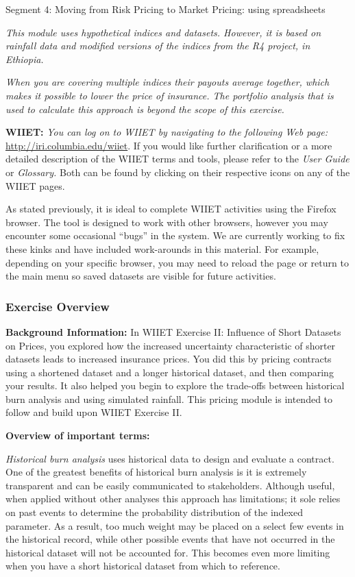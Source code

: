 \documentclass[letterpaper,10pt,english]{sphinxmanual}
\begin{document}
Segment 4: Moving from Risk Pricing to Market Pricing: using spreadsheets

\emph{This module uses hypothetical indices and datasets. However, it is based on rainfall data and modified versions of the indices from the R4 project, in Ethiopia.}

\emph{When you are covering multiple indices their payouts average together, which makes it possible to lower the price of insurance. The portfolio analysis that is used to calculate this approach is beyond the scope of this exercise.}

\textbf{WIIET:} \emph{You can log on to WIIET by navigating to the following Web page:} \href{http://iri.columbia.edu/wiiet}{http://iri.columbia.edu/wiiet}. If you would like further clarification or a more detailed description of the WIIET terms and tools, please refer to the \emph{User Guide} or \emph{Glossary.} Both can be found by clicking on their respective icons on any of the WIIET pages.

As stated previously, it is ideal to complete WIIET activities using the Firefox browser. The tool is designed to work with other browsers, however you may encounter some occasional ``bugs'' in the system. We are currently working to fix these kinks and have included work-arounds in this material. For example, depending on your specific browser, you may need to reload the page or return to the main menu so saved datasets are visible for future activities.


\subsubsection{Exercise Overview}
\label{wiiet/wiiet_initialtomarketpricing_Web:exercise-overview}
\textbf{Background Information:} In WIIET Exercise II: Influence of Short Datasets on Prices, you explored how the increased uncertainty characteristic of shorter datasets leads to increased insurance prices. You did this by pricing contracts using a shortened dataset and a longer historical dataset, and then comparing your results. It also helped you begin to explore the trade-offs between historical burn analysis and using simulated rainfall. This pricing module is intended to follow and build upon WIIET Exercise II.

\textbf{Overview of important terms:}

\emph{Historical burn analysis} uses historical data to design and evaluate a contract. One of the greatest benefits of historical burn analysis is it is extremely transparent and can be easily communicated to stakeholders. Although useful, when applied without other analyses this approach has limitations; it sole relies on past events to determine the probability distribution of the indexed parameter. As a result, too much weight may be placed on a select few events in the historical record, while other possible events that have not occurred in the historical dataset will not be accounted for. This becomes even more limiting when you have a short historical dataset from which to reference.
\end{document}
